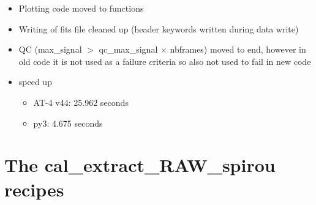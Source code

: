 \begin{itemize}
\item Plotting code moved to  functions

\item Writing of fits file cleaned up (header keywords written during data write)

\item QC (max\_signal $>$ qc\_max\_signal $\times$ nbframes) moved to end, however in old code it is not used as a failure criteria so also not used to fail in new code

\item speed up
	\begin{itemize}
	\item AT-4 v44: 25.962 seconds
	\item py3: 4.675 seconds
    \end{itemize}

\end{itemize}

\section{The cal\_extract\_RAW\_spirou recipes}
\label{ch:changelog:At4:cal_extract_RAW_spirou}


